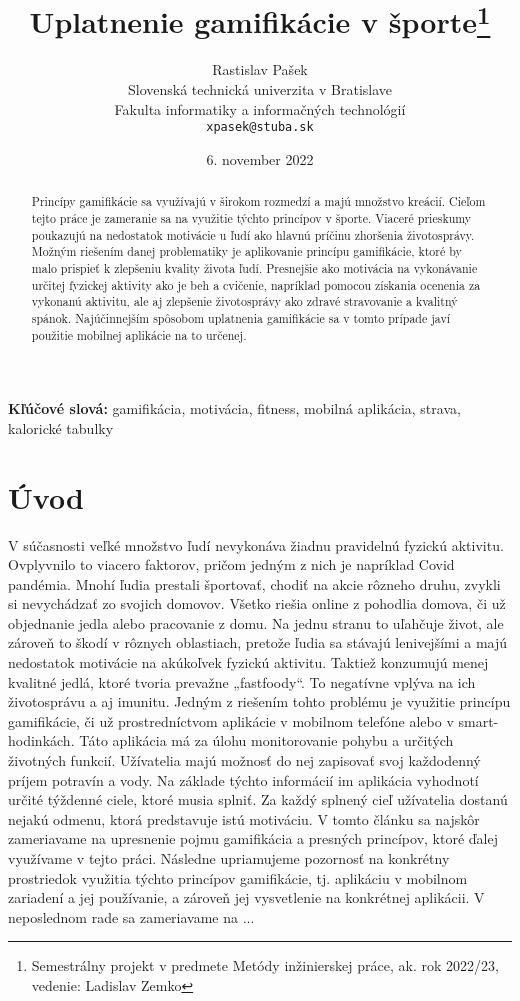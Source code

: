 \documentclass[10pt,twoside,slovak,a4paper]{article}
\title{Uplatnenie gamifikácie v športe\thanks{Semestrálny projekt v predmete Metódy inžinierskej práce, ak. rok 2022/23, vedenie: Ladislav Zemko}} %
\author{Rastislav Pašek\\[2pt]
	{\small Slovenská technická univerzita v Bratislave}\\
	{\small Fakulta informatiky a informačných technológií}\\
	{\small \texttt{xpasek@stuba.sk}}
	}
\date{\small 6. november 2022} %
\begin{document}
\maketitle

\begin{abstract}
Princípy gamifikácie sa využívajú v širokom rozmedzí a majú množstvo kreácií. Cieľom tejto práce je zameranie sa na využitie týchto princípov v športe. Viaceré prieskumy poukazujú na nedostatok motivácie u ľudí ako hlavnú príčinu zhoršenia životosprávy. Možným riešením danej problematiky je aplikovanie princípu gamifikácie, ktoré by malo prispieť k zlepšeniu kvality života ľudí. Presnejšie ako motivácia na vykonávanie určitej fyzickej aktivity ako je beh a cvičenie, napríklad pomocou získania ocenenia za vykonanú aktivitu, ale aj zlepšenie životosprávy ako zdravé stravovanie a kvalitný spánok. Najúčinnejším spôsobom uplatnenia gamifikácie sa v tomto prípade javí použitie mobilnej aplikácie na to určenej.
\end{abstract}



\textbf {Kľúčové slová:} gamifikácia, motivácia, fitness, mobilná aplikácia, strava, kalorické tabulky



\section{Úvod}

	V súčasnosti veľké množstvo ľudí nevykonáva žiadnu pravidelnú fyzickú aktivitu. Ovplyvnilo to viacero faktorov, pričom jedným z nich je napríklad Covid pandémia. Mnohí ľudia prestali športovať, chodiť na akcie rôzneho druhu, zvykli si nevychádzať zo svojich domovov. Všetko riešia online z pohodlia domova, či už objednanie jedla alebo pracovanie z domu. Na jednu stranu to uľahčuje život, ale zároveň to škodí v rôznych oblastiach, pretože ľudia sa stávajú lenivejšími a majú nedostatok motivácie na akúkoľvek fyzickú aktivitu. Taktiež konzumujú menej kvalitné jedlá, ktoré tvoria prevažne „fastfoody“. To negatívne vplýva na ich životosprávu a aj imunitu. 
	Jedným z riešením tohto problému je využitie princípu gamifikácie, či už prostredníctvom aplikácie v mobilnom telefóne alebo v smart-hodinkách. Táto aplikácia má za úlohu monitorovanie pohybu a určitých životných funkcií. Užívatelia majú možnosť do nej zapisovať svoj každodenný príjem potravín a vody. Na základe týchto informácií im aplikácia vyhodnotí určité týždenné ciele, ktoré musia splniť. Za každý splnený cieľ užívatelia dostanú nejakú odmenu, ktorá predstavuje istú motiváciu. 
	V tomto článku sa najskôr zameriavame na upresnenie pojmu gamifikácia a presných princípov, ktoré ďalej využívame v tejto práci. Následne upriamujeme pozornosť na konkrétny prostriedok využitia týchto princípov gamifikácie, tj. aplikáciu v mobilnom zariadení a jej používanie, a zároveň jej vysvetlenie na konkrétnej aplikácii. V neposlednom rade sa zameriavame na ...
\end{document}
